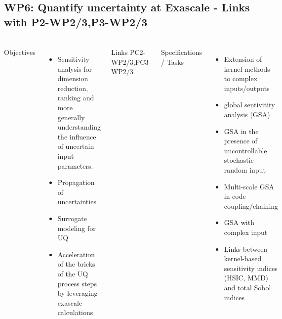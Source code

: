 \subsection{WP6: Quantify uncertainty at Exascale - Links with P2-WP2/3,P3-WP2/3 }
\begin{frame}
  \frametitle{\insertsectionhead}
  \framesubtitle{\insertsubsectionhead}
  \footnotesize
  \begin{columns}
    Objectives
    \begin{itemize}
      \item Sensitivity analysis for dimension reduction, ranking and more generally understanding the influence of uncertain input parameters.
       \item  Propagation of uncertainties
      \item Surrogate modeling for UQ
      \item Acceleration of the bricks of the UQ process steps by leveraging exascale calculations
    \end{itemize}

    \begin{alertblock}{Links}
      PC2-WP2/3,PC3-WP2/3
    \end{alertblock}
    Specifications / Tasks
      \begin{itemize}
        \item Extension of kernel methods to complex inputs/outputs
        \item global sentivitity analysis (GSA) 
        \item  GSA in the presence of uncontrollable stochastic random input
        \item Multi-scale GSA in code coupling/chaining
        \item GSA with complex input 
        \item  Links between kernel-based sensitivity indices (HSIC, MMD) and total Sobol indices
      \end{itemize}


  \end{columns}
\end{frame}

